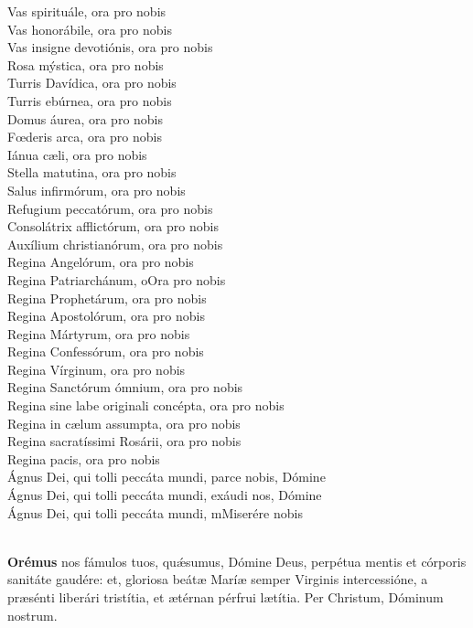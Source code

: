 \documentclass[9pt]{article}
\begin{document}
\begin{multicols*}{2}
    Vas spirituále, ora pro nobis\\
    Vas honorábile, ora pro nobis\\
    Vas insigne devotiónis, ora pro nobis\\
    Rosa mýstica, ora pro nobis\\
    Turris Davídica, ora pro nobis\\
    Turris ebúrnea, ora pro nobis\\
    Domus áurea, ora pro nobis\\
    F{\oe}deris arca, ora pro nobis\\
    Iánua c{\ae}li, ora pro nobis\\
    Stella matutina, ora pro nobis\\
    Salus infirmórum, ora pro nobis\\
    Refugium peccatórum, ora pro nobis\\
    Consolátrix afflictórum, ora pro nobis\\
    Auxílium christianórum, ora pro nobis\\
    Regina Angelórum, ora pro nobis\\
    Regina Patriarchánum, oOra pro nobis\\
    Regina Prophetárum, ora pro nobis\\
    Regina Apostolórum, ora pro nobis\\
    Regina Mártyrum, ora pro nobis\\
    Regina Confessórum, ora pro nobis\\
    Regina Vírginum, ora pro nobis\\
    Regina Sanctórum ómnium, ora pro nobis\\
    Regina sine labe originali concépta, ora pro nobis\\
    Regina in c{\ae}lum assumpta, ora pro nobis\\
    Regina sacratíssimi Rosárii, ora pro nobis\\
    Regina pacis, ora pro nobis\\
    Ágnus Dei, qui tolli peccáta mundi, parce nobis, Dómine\\
    Ágnus Dei, qui tolli peccáta mundi, exáudi nos, Dómine\\
    Ágnus Dei, qui tolli peccáta mundi, mMiserére nobis\\
    \orapronobissalve\\

    \newpage

    \textbf{Orémus}
     nos fámulos tuos, qu{\'\ae}sumus, Dómine Deus, perpétua mentis et córporis sanitáte gaudére: et, gloriosa beát{\ae}
    Marí{\ae} semper Virginis intercessióne, a pr{\ae}sénti liberári tristítia, et {\ae}térnan pérfrui l{\ae}títia. Per Christum, Dóminum nostrum.
    \\


\end{multicols*}
\end{document}
